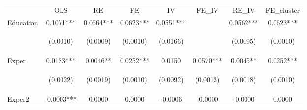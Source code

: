 \begin{center}
\begin{tabular}{lccccccc}
\hline \noalign{\smallskip} & OLS & RE & FE & IV & FE_IV & RE_IV & FE_cluster\\
\noalign{\smallskip}\hline \noalign{\smallskip}Education & 0.1071*** & 0.0664*** & 0.0623*** & 0.0551*** &  & 0.0562*** & 0.0623***\\
 & \begin{footnotesize}(0.0010)\end{footnotesize} & \begin{footnotesize}(0.0009)\end{footnotesize} & \begin{footnotesize}(0.0010)\end{footnotesize} & \begin{footnotesize}(0.0166)\end{footnotesize} & \begin{footnotesize}\end{footnotesize} & \begin{footnotesize}(0.0095)\end{footnotesize} & \begin{footnotesize}(0.0010)\end{footnotesize}\\
\noalign{\smallskip}Exper & 0.0133*** & 0.0046** & 0.0252*** & 0.0150 & 0.0570*** & 0.0045** & 0.0252***\\
 & \begin{footnotesize}(0.0022)\end{footnotesize} & \begin{footnotesize}(0.0019)\end{footnotesize} & \begin{footnotesize}(0.0010)\end{footnotesize} & \begin{footnotesize}(0.0092)\end{footnotesize} & \begin{footnotesize}(0.0013)\end{footnotesize} & \begin{footnotesize}(0.0018)\end{footnotesize} & \begin{footnotesize}(0.0010)\end{footnotesize}\\
\noalign{\smallskip}Exper2 & -0.0003*** & 0.0000 & 0.0000 & -0.0006 & -0.0000 & -0.0000 & 0.0000\\

\end{tabular}
\end{center}
